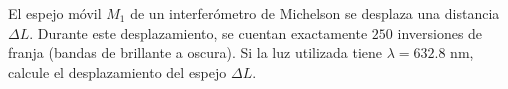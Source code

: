 \item El espejo móvil $M_1$ de un interferómetro de Michelson se desplaza una distancia $\Delta L$. Durante este desplazamiento, se cuentan exactamente $250$ inversiones de franja (bandas de brillante a oscura). Si la luz utilizada tiene $\lambda = 632.8\text{ nm}$, calcule el desplazamiento del espejo $\Delta L$.